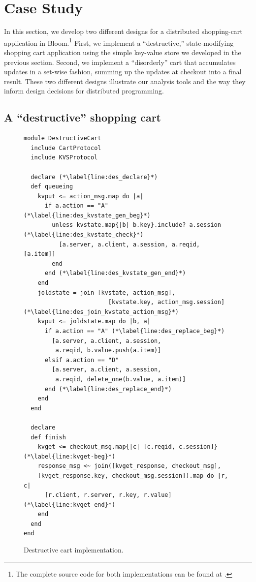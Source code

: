 \section{Case Study}
\label{sec:case}


In this section, we develop two different designs for a distributed shopping-cart
application in Bloom.\footnote{The complete source code for 
both implementations can be found at .}
First, we implement a ``destructive,'' state-modifying
shopping cart application using the simple key-value store we developed in the
previous section.
Second, we implement a ``disorderly'' cart that accumulates updates in a 
set-wise fashion, summing up the updates at checkout into a final result.  These two different designs illustrate our analysis tools and the way they inform design decisions for distributed programming.  

\subsection{A ``destructive'' shopping cart}

\begin{figure}[t]
\begin{scriptsize}
\begin{lstlisting}
module DestructiveCart
  include CartProtocol
  include KVSProtocol

  declare (*\label{line:des_declare}*)
  def queueing
    kvput <= action_msg.map do |a|
      if a.action == "A" (*\label{line:des_kvstate_gen_beg}*)
        unless kvstate.map{|b| b.key}.include? a.session (*\label{line:des_kvstate_check}*)
          [a.server, a.client, a.session, a.reqid, [a.item]]
        end
      end (*\label{line:des_kvstate_gen_end}*)
    end
    joldstate = join [kvstate, action_msg],
                        [kvstate.key, action_msg.session]  (*\label{line:des_join_kvstate_action_msg}*)
    kvput <= joldstate.map do |b, a|
      if a.action == "A" (*\label{line:des_replace_beg}*)
        [a.server, a.client, a.session, 
         a.reqid, b.value.push(a.item)]
      elsif a.action == "D"
        [a.server, a.client, a.session, 
         a.reqid, delete_one(b.value, a.item)]
      end (*\label{line:des_replace_end}*)
    end
  end

  declare
  def finish
    kvget <= checkout_msg.map{|c| [c.reqid, c.session]} (*\label{line:kvget-beg}*)
    response_msg <~ join([kvget_response, checkout_msg],
    [kvget_response.key, checkout_msg.session]).map do |r, c|
      [r.client, r.server, r.key, r.value] (*\label{line:kvget-end}*)
    end
  end
end
\end{lstlisting}
\vspace{-10pt}
\caption{Destructive cart implementation.}
\label{fig:dest-cart}
\end{scriptsize}
\vspace{-2pt}
\end{figure}

